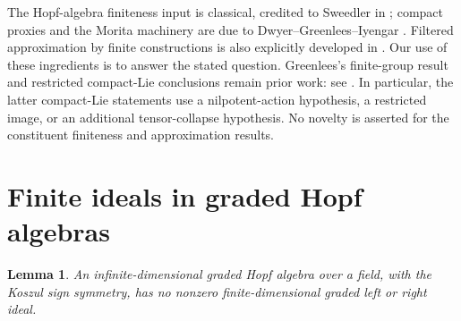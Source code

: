 \documentclass[11pt]{article}
\newtheorem{lemma}[theorem]{Lemma}
\begin{document}
The Hopf-algebra finiteness input is classical, credited to Sweedler in \cite[\S2.4]{Lomp}; compact proxies and the Morita machinery are due to Dwyer--Greenlees--Iyengar \cite{DGI}. Filtered approximation by finite constructions is also explicitly developed in \cite{BIS}. Our use of these ingredients is to answer the stated question. Greenlees's finite-group result and restricted compact-Lie conclusions remain prior work: see \cite[Lemmas 6.2 and 6.5, Remark 6.6]{Greenlees}. In particular, the latter compact-Lie statements use a nilpotent-action hypothesis, a restricted image, or an additional tensor-collapse hypothesis. No novelty is asserted for the constituent finiteness and approximation results.

\section{Finite ideals in graded Hopf algebras}

\begin{lemma}\label{lem:hopf}
An infinite-dimensional graded Hopf algebra over a field, with the Koszul sign symmetry, has no nonzero finite-dimensional graded left or right ideal.
\end{lemma}
\end{document}
